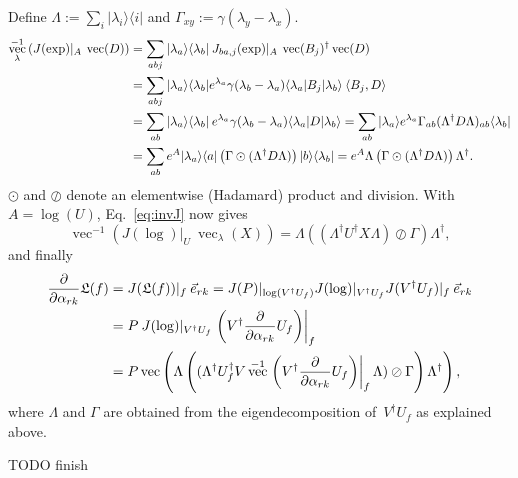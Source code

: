 \documentclass[aps,pra,12pt,showpacs,showkeys,nofootinbib,superscriptaddress,longbibliography]{revtex4}
\newcommand{\bra}[1]{\mbox{$\langle #1|$}}
\newcommand{\ket}[1]{\mbox{$|#1\rangle$}}
\newcommand{\ketbra}[2]{\mbox{$|#1\rangle\langle #2|$}}
\newcommand{\inprod}[2]{\mbox{$\langle #1, #2\rangle$}}
\DeclareMathOperator{\VEC}{vec}
\newcommand{\mf}[1]{\mathfrak{#1}}
\newcommand{\pde}[2]{\frac{\partial #1}{\partial #2}}
\newcommand{\be}{\begin{equation}}
\newcommand{\ee}{\end{equation}}
\begin{document}
Define $\Lambda := \sum_i \ketbra{\lambda_i}{i}$ and $\Gamma_{xy} := \gamma(\lambda_y-\lambda_x)$.
\begin{align}
\notag
\VEC_{\lambda}^{-1}\left(J(\exp)|_A \: \VEC(D)\right)
&= \sum_{abj} \ketbra{\lambda_a}{\lambda_b} \: J_{ba,j}(\exp)|_A \: \VEC(B_j)^\dagger \VEC(D)\\
\notag
&= \sum_{abj} \ketbra{\lambda_a}{\lambda_b}
e^{\lambda_a} \gamma(\lambda_b - \lambda_a) \bra{\lambda_a} B_j \ket{\lambda_b} \: \inprod{B_j}{D}\\
\notag
&= \sum_{ab} \ketbra{\lambda_a}{\lambda_b} \: e^{\lambda_a} \gamma(\lambda_b -\lambda_a) \bra{\lambda_a}
D \ket{\lambda_b}
= \sum_{ab} \ket{\lambda_a} e^{\lambda_a} \Gamma_{ab} (\Lambda^\dagger
D \Lambda)_{ab} \bra{\lambda_b}\\
&= \sum_{ab} e^A  \ketbra{\lambda_a}{a} \left(\Gamma \odot
(\Lambda^\dagger D \Lambda) \right) \ketbra{b}{\lambda_b}
= e^A \Lambda \left(\Gamma \odot (\Lambda^\dagger D \Lambda) \right) \Lambda^\dagger.
\end{align}
$\odot$ and $\oslash$ denote an elementwise (Hadamard) product and division.
With $A = \log(U)$, Eq.~\eqref{eq:invJ} now gives
\be
\VEC^{-1}\left(J(\log)|_U \: \VEC_{\lambda}(X)\right)
= \Lambda \left((\Lambda^\dagger U^\dagger X \Lambda)
\oslash \Gamma\right) \Lambda^\dagger,
\ee
and finally
\begin{align}
\notag
\pde{}{\alpha_{rk}} \mf{L}(f)
&= J(\mf{L}(f))|_f \: \vec{e}_{rk}
= J(P)|_{\log(V^\dagger U_f)} J(\log)|_{V^\dagger U_f} J(V^\dagger U_f)|_{f} \: \vec{e}_{rk}\\
\notag
&= P \: J(\log)|_{V^\dagger U_f}
\left. \left( V^\dagger \pde{}{\alpha_{rk}} U_f \right)\right|_{f}\\
&= P \VEC \left( 
\Lambda \left((\Lambda^\dagger U_f^\dagger V \VEC^{-1}
\left. \left( V^\dagger \pde{}{\alpha_{rk}} U_f \right)\right|_{f}
\Lambda) \oslash \Gamma \right) \Lambda^\dagger
\right),
\end{align}
where $\Lambda$ and $\Gamma$ are obtained from the eigendecomposition
of~$V^\dagger U_f$ as explained above.

TODO finish



\end{document}
